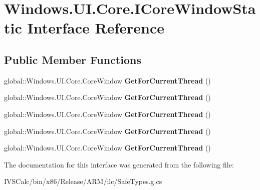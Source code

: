 \hypertarget{interface_windows_1_1_u_i_1_1_core_1_1_i_core_window_static}{}\section{Windows.\+U\+I.\+Core.\+I\+Core\+Window\+Static Interface Reference}
\label{interface_windows_1_1_u_i_1_1_core_1_1_i_core_window_static}
\subsection*{Public Member Functions}
\begin{DoxyCompactItemize}
\item 
\mbox{\label{interface_windows_1_1_u_i_1_1_core_1_1_i_core_window_static_aae8219806b181771bf23ddd4a0ed930e}} 
global\+::\+Windows.\+U\+I.\+Core.\+Core\+Window {\bfseries Get\+For\+Current\+Thread} ()
\item 
\mbox{\label{interface_windows_1_1_u_i_1_1_core_1_1_i_core_window_static_aae8219806b181771bf23ddd4a0ed930e}} 
global\+::\+Windows.\+U\+I.\+Core.\+Core\+Window {\bfseries Get\+For\+Current\+Thread} ()
\item 
\mbox{\label{interface_windows_1_1_u_i_1_1_core_1_1_i_core_window_static_aae8219806b181771bf23ddd4a0ed930e}} 
global\+::\+Windows.\+U\+I.\+Core.\+Core\+Window {\bfseries Get\+For\+Current\+Thread} ()
\item 
\mbox{\label{interface_windows_1_1_u_i_1_1_core_1_1_i_core_window_static_aae8219806b181771bf23ddd4a0ed930e}} 
global\+::\+Windows.\+U\+I.\+Core.\+Core\+Window {\bfseries Get\+For\+Current\+Thread} ()
\item 
\mbox{\label{interface_windows_1_1_u_i_1_1_core_1_1_i_core_window_static_aae8219806b181771bf23ddd4a0ed930e}} 
global\+::\+Windows.\+U\+I.\+Core.\+Core\+Window {\bfseries Get\+For\+Current\+Thread} ()
\end{DoxyCompactItemize}


The documentation for this interface was generated from the following file\+:\begin{DoxyCompactItemize}
\item 
I\+V\+S\+Calc/bin/x86/\+Release/\+A\+R\+M/ilc/Safe\+Types.\+g.\+cs\end{DoxyCompactItemize}
